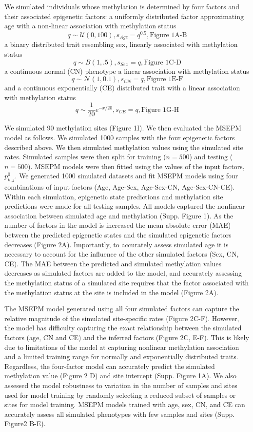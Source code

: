 \documentclass{article}
\begin{document}
{\begin{linenumbers}
We simulated individuals whose methylation is determined by four factors and their associated epigenetic factors: 
a uniformly distributed factor approximating age with a non-linear association with methylation status 
$$q \sim\mathcal{U}(0,100), s_{Age}=q^{0.5}, \text{Figure 1A-B}$$ a binary distributed trait resembling sex, linearly associated 
with methylation status $$q \sim B(1,.5), s_{Sex}=q, \text{Figure 1C-D}$$ a continuous normal (CN) phenotype a linear 
association with methylation status $$q \sim\mathcal{N}(1, 0.1), s_{CN}=q, 
\text{Figure 1E-F}$$ and a 
continuous exponentially (CE) distributed trait with a linear association with methylation status 
$$q \sim \frac{1}{20}e^{-x/20}, s_{CE}=q, \text{Figure 1G-H}$$ 


We simulated 90 methylation sites (Figure 1I). We then evaluated the MSEPM model as follows. We simulated 1000 samples with the 
four epigenetic factors described above. We then simulated methylation values using the simulated site rates. Simulated samples
 were then split for training ($n=500$) and testing ($n=500$). MSEPM models were then fitted using the values of the input factors, $p^0_{k,j}$. 
 We generated 1000 simulated datasets and fit MSEPM models using four combinations of input factors (Age, Age-Sex, Age-Sex-CN, Age-Sex-CN-CE). 
 Within each simulation, epigenetic state predictions and methylation site predictions were made for all testing samples. All models captured 
 the nonlinear association between simulated age and methylation (Supp. Figure 1). As the number of factors in the model is increased the mean 
 absolute error (MAE) between the predicted epigenetic states and the simulated epigenetic factors decreases (Figure 2A). Importantly, to accurately
  assess simulated age it is necessary to account for the influence of the other simulated factors (Sex, CN, CE). The MAE between the predicted 
  and simulated methylation values decreases as simulated factors are added to the model, and accurately assessing the methylation status of a 
  simulated site requires that the factor associated with the methylation status at the site is included in the model (Figure 2A). 

The MSEPM model generated using all four simulated factors can capture the relative magnitude of the simulated site-specific rates (Figure 2C-F).  
However, the model has difficulty capturing the exact relationship between the simulated factors (age, CN and CE) and the inferred 
factors (Figure 2C, E-F). This is likely due to limitations of the model at capturing nonlinear methylation association and a 
limited training range for normally and exponentially distributed traits. Regardless, the four-factor model can accurately 
predict the simulated methylation value (Figure 2 D) and site intercept (Supp. Figure 1A). We also assessed the model 
robustness to variation in the number of samples and sites used for model training by randomly selecting a reduced 
subset of samples or sites for model training. MSEPM models trained with age, sex, CN, and CE can accurately assess 
all simulated phenotypes with few samples and sites (Supp. Figure2 B-E). 


\end{linenumbers}}
\end{document}
